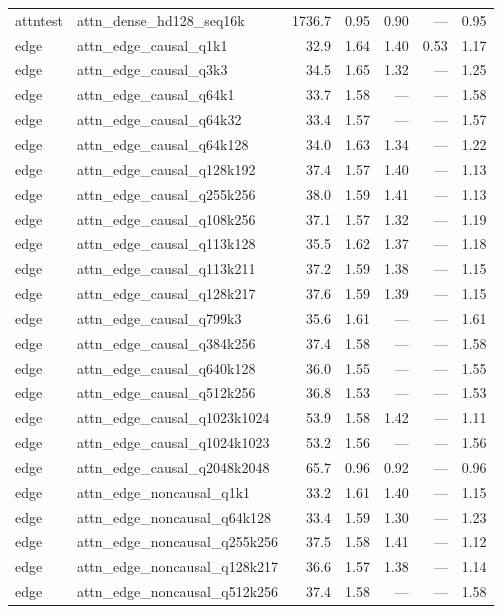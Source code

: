 \begin{longtable}{@{}llrrrrr@{}}
attntest & attn\_dense\_hd128\_seq16k & 1736.7 & 0.95 & 0.90 & --- & 0.95 \\
edge & attn\_edge\_causal\_q1k1 & 32.9 & 1.64 & 1.40 & 0.53 & 1.17 \\
edge & attn\_edge\_causal\_q3k3 & 34.5 & 1.65 & 1.32 & --- & 1.25 \\
edge & attn\_edge\_causal\_q64k1 & 33.7 & 1.58 & --- & --- & 1.58 \\
edge & attn\_edge\_causal\_q64k32 & 33.4 & 1.57 & --- & --- & 1.57 \\
edge & attn\_edge\_causal\_q64k128 & 34.0 & 1.63 & 1.34 & --- & 1.22 \\
edge & attn\_edge\_causal\_q128k192 & 37.4 & 1.57 & 1.40 & --- & 1.13 \\
edge & attn\_edge\_causal\_q255k256 & 38.0 & 1.59 & 1.41 & --- & 1.13 \\
edge & attn\_edge\_causal\_q108k256 & 37.1 & 1.57 & 1.32 & --- & 1.19 \\
edge & attn\_edge\_causal\_q113k128 & 35.5 & 1.62 & 1.37 & --- & 1.18 \\
edge & attn\_edge\_causal\_q113k211 & 37.2 & 1.59 & 1.38 & --- & 1.15 \\
edge & attn\_edge\_causal\_q128k217 & 37.6 & 1.59 & 1.39 & --- & 1.15 \\
edge & attn\_edge\_causal\_q799k3 & 35.6 & 1.61 & --- & --- & 1.61 \\
edge & attn\_edge\_causal\_q384k256 & 37.4 & 1.58 & --- & --- & 1.58 \\
edge & attn\_edge\_causal\_q640k128 & 36.0 & 1.55 & --- & --- & 1.55 \\
edge & attn\_edge\_causal\_q512k256 & 36.8 & 1.53 & --- & --- & 1.53 \\
edge & attn\_edge\_causal\_q1023k1024 & 53.9 & 1.58 & 1.42 & --- & 1.11 \\
edge & attn\_edge\_causal\_q1024k1023 & 53.2 & 1.56 & --- & --- & 1.56 \\
edge & attn\_edge\_causal\_q2048k2048 & 65.7 & 0.96 & 0.92 & --- & 0.96 \\
edge & attn\_edge\_noncausal\_q1k1 & 33.2 & 1.61 & 1.40 & --- & 1.15 \\
edge & attn\_edge\_noncausal\_q64k128 & 33.4 & 1.59 & 1.30 & --- & 1.23 \\
edge & attn\_edge\_noncausal\_q255k256 & 37.5 & 1.58 & 1.41 & --- & 1.12 \\
edge & attn\_edge\_noncausal\_q128k217 & 36.6 & 1.57 & 1.38 & --- & 1.14 \\
edge & attn\_edge\_noncausal\_q512k256 & 37.4 & 1.58 & --- & --- & 1.58 \\

\end{longtable}
